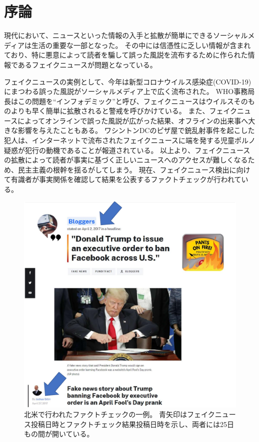 \section{序論}
\label{ch:introduction}

現代において、ニュースといった情報の入手と拡散が簡単にできるソーシャルメディアは生活の重要な一部となった。
その中には信憑性に乏しい情報が含まれており、特に悪意によって読者を騙して誤った風説を流布するために作られた情報であるフェイクニュースが問題となっている。

フェイクニュースの実例として、今年は新型コロナウイルス感染症(COVID-19)にまつわる誤った風説がソーシャルメディア上で広く流布された。
WHO事務局長はこの問題を``インフォデミック''と呼び、フェイクニュースはウイルスそのものよりも早く簡単に拡散されると警戒を呼びかけている\cite{ZAROCOSTAS2020676}。
また、フェイクニュースによってオンラインで誤った風説が広がった結果、オフラインの出来事へ大きな影響を与えたこともある。
ワシントンDCのピザ屋で銃乱射事件を起こした犯人は、インターネットで流布されたフェイクニュースに端を発する児童ポルノ疑惑が犯行の動機であることが報道されている\cite{agencies_2016}。
以上より、フェイクニュースの拡散によって読者が事実に基づく正しいニュースへのアクセスが難しくなるため、民主主義の根幹を揺るがしてしまう。
現在、フェイクニュース検出に向けて有識者が事実関係を確認して結果を公表するファクトチェックが行われている。

\begin{figure}[t]
    \centering
    \includegraphics[width=\linewidth]{images/fact-check.pdf}
    \caption{
        北米で行われたファクトチェックの一例。
        青矢印はフェイクニュース投稿日時とファクトチェック結果投稿日時を示し、両者には25日もの間が開いている。
        }
    \label{fig:example}
\end{figure}

